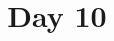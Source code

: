 \documentclass{article}
\begin{document}
\title{Day 10}
\author{}
\date{}
\maketitle


\end{document}
